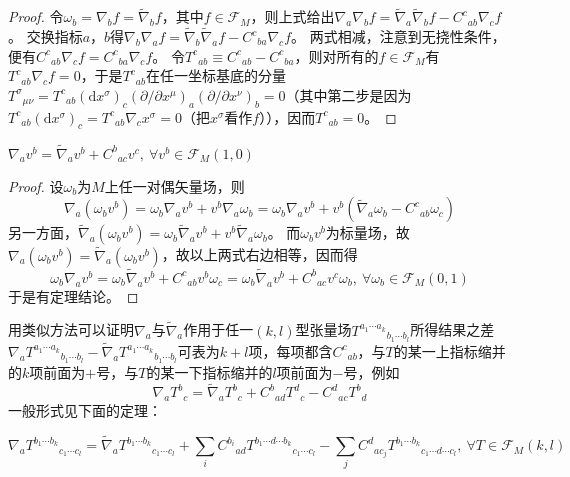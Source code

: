\begin{proof}
令$\omega_b = \nabla_bf = \tilde\nabla_bf$，其中$f \in \mathscr{F}_M$，则上式给出$\nabla_a\nabla_bf = \tilde\nabla_a\tilde\nabla_bf - C^c{}_{ab}\nabla_cf$。
交换指标$a$，$b$得$\nabla_b\nabla_af = \tilde\nabla_b\tilde\nabla_af - C^c{}_{ba}\nabla_cf$。
两式相减，注意到无挠性条件，便有$C^c{}_{ab}\nabla_cf = C^c{}_{ba}\nabla_cf$。
令$T^c{}_{ab} \equiv C^c{}_{ab} - C^c{}_{ba}$，则对所有的$f \in \mathscr{F}_M$有$T^c{}_{ab}\nabla_cf = 0$，于是$T^c{}_{ab}$在任一坐标基底的分量$T^\sigma{}_{\mu\nu} = T^c{}_{ab}(\mathrm{d}x^\sigma)_c(\partial / \partial x^\mu)_a(\partial / \partial x^\nu)_b = 0$（其中第二步是因为$T^c{}_{ab}(\mathrm{d}x^\sigma)_c = T^c{}_{ab}\nabla_cx^\sigma = 0$（把$x^\sigma$看作$f$）），因而$T^c{}_{ab} = 0$。
\end{proof}

\begin{theorem}
$\nabla_av^b = \tilde\nabla_av^b + C^b{}_{ac}v^c, ~ \forall v^b \in \mathscr{F}_M(1, 0)$
\end{theorem}

\begin{proof}
设$\omega_b$为$M$上任一对偶矢量场，则
$$\nabla_a(\omega_bv^b) = \omega_b\nabla_av^b + v^b\nabla_a\omega_b = \omega_b\nabla_av^b + v^b(\tilde\nabla_a\omega_b - C^c{}_{ab}\omega_c)$$
另一方面，$\tilde\nabla_a(\omega_bv^b) = \omega_b\tilde\nabla_av^b + v^b\tilde\nabla_a\omega_b$。
而$\omega_bv^b$为标量场，故$\nabla_a(\omega_bv^b) = \tilde\nabla_a(\omega_bv^b)$，故以上两式右边相等，因而得
$$\omega_b\nabla_av^b = \omega_b\tilde\nabla_av^b + C^c{}_{ab}v^b\omega_c = \omega_b\tilde\nabla_av^b + C^b{}_{ac}v^c\omega_b, ~ \forall \omega_b \in \mathscr{F}_M(0, 1)$$
于是有定理结论。
\end{proof}

用类似方法可以证明$\nabla_a$与$\tilde\nabla_a$作用于任一$(k, l)$型张量场$T^{a_1 \cdots a_k}{}_{b_1 \cdots b_l}$所得结果之差$\nabla_aT^{a_1 \cdots a_k}{}_{b_1 \cdots b_l} - \tilde\nabla_aT^{a_1 \cdots a_k}{}_{b_1 \cdots b_l}$可表为$k + l$项，每项都含$C^c{}_{ab}$，与$T$的某一上指标缩并的$k$项前面为$+$号，与$T$的某一下指标缩并的$l$项前面为$-$号，例如
$$\nabla_aT^b{}_{c} = \tilde\nabla_aT^b{}_{c} + C^b{}_{ad}T^d{}_{c} - C^d{}_{ac}T^b{}_{d}$$
一般形式见下面的定理：
\begin{theorem}
$$\nabla_aT^{b_1 \cdots b_k}{}_{c_1 \cdots c_l} = \tilde\nabla_aT^{b_1 \cdots b_k}{}_{c_1 \cdots c_l} + \sum_iC^{b_i}{}_{ad}T^{b_1 \cdots d \cdots b_k}{}_{c_1 \cdots c_l} - \sum_jC^d{}_{ac_j}T^{b_1 \cdots b_k}{}_{c_1 \cdots d \cdots c_l}, ~ \forall T \in \mathscr{F}_M(k, l)$$
\end{theorem}

